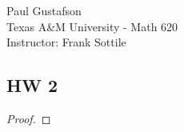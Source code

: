 \documentclass{article}
\begin{document}
\noindent Paul Gustafson\\
\noindent Texas A\&M University - Math 620\\ 
\noindent Instructor: Frank Sottile

\subsection*{HW 2}
\begin{proof}
\end{proof}
\end{document}
